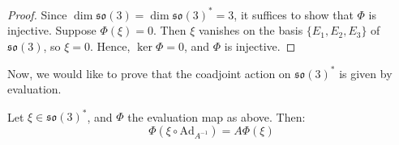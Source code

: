 \begin{proof}
Since $\dim \mathfrak{so}(3) = \dim \mathfrak{so}(3)^* = 3$, it suffices to show that $\Phi$ is injective. Suppose $\Phi(\xi) = 0$. Then $\xi$ vanishes on the basis $\{E_1, E_2, E_3\}$ of $\mathfrak{so}(3)$, so $\xi = 0$. Hence, $\ker \Phi = 0$, and $\Phi$ is injective.
\end{proof}

\begin{remark}
Now, we would like to prove that the coadjoint action on $\mathfrak{so}(3)^{*}$ is given by evaluation. 
\end{remark}

\begin{lemma}
\label{ActionEvalulation}
Let $\xi \in \mathfrak{so}(3)^{*}$, and $\Phi$ the evaluation map as above. Then:
\[
\Phi\left( \xi \circ \mathrm{Ad}_{A^{-1}} \right) = A \Phi(\xi)
\]
\end{lemma}

